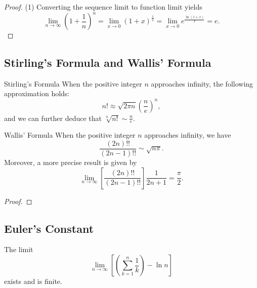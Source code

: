 \begin{proof}
  (1) Converting the sequence limit to function limit yields
  \begin{equation}
    \lim \limits _{n \rightarrow \infty} \left( 1 + \frac{1}{n} \right)^n
    = \lim \limits _{x \rightarrow 0} (1 + x)^{\frac{1}{x}}
    = \lim \limits _{x \rightarrow 0} e^{\frac{\ln (1 + x)}{x}} = e.
  \end{equation}
\end{proof}

\subsection{Stirling's Formula and Wallis' Formula}

\begin{theorem}{Stirling's Formula}{}
  When the positive integer $n$ approaches infinity,
  the following approximation holds:
  \begin{equation}
    n! \approx \sqrt{2\pi n} \left( \frac{n}{e} \right)^n,
  \end{equation}
  and we can further deduce that $\sqrt[n]{n!} \sim \frac{n}{e}$.
\end{theorem}

\begin{theorem}{Wallis' Formula}{}
  When the positive integer $n$ approaches infinity,
  we have
  \begin{equation}
    \frac{(2n)!!}{(2n - 1)!!} \sim \sqrt{n \pi}.
  \end{equation}
  Moreover, a more precise result is given by
  \begin{equation}
    \lim \limits _{n \rightarrow \infty} \left[
      \frac{(2n)!!}{(2n - 1)!!}
    \right]\frac{1}{2n+1} = \frac{\pi}{2}.
  \end{equation}
\end{theorem}

\begin{proof}
  
\end{proof}

\subsection{Euler's Constant}

\begin{lemma}{}{}
  The limit
  \begin{equation}
    \lim \limits _{n \rightarrow \infty}
  \left[ (\sum\limits_{k = 1}^n \frac{1}{k}) - \ln n \right]
  \end{equation}
  exists and is finite.
\end{lemma}

